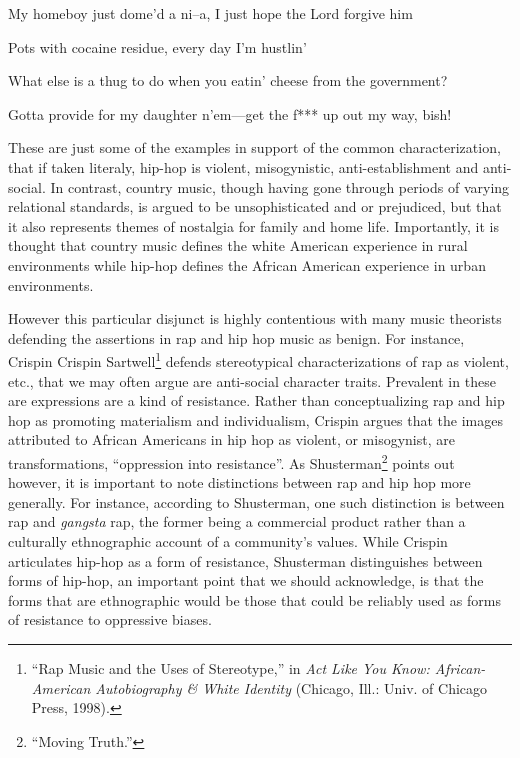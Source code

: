 \documentclass[phdthesis,12pt,final]{wuthesis}
\theoremstyle{definition}
\theoremstyle{definition}
\theoremstyle{definition}
\theoremstyle{definition}
\theoremstyle{remark}
\begin{document}
My homeboy just dome'd a ni--a, I just hope the Lord forgive him

Pots with cocaine residue, every day I'm hustlin'

What else is a thug to do when you eatin' cheese from the government?

Gotta provide for my daughter n'em---get the f*** up out my way, bish!

These are just some of the examples in support of the common characterization, that if taken literaly, hip-hop is violent, misogynistic, anti-establishment and anti-social. In contrast, country music, though having gone through periods of varying relational standards, is argued to be unsophisticated and or prejudiced, but that it also represents themes of nostalgia for family and home life. Importantly, it is thought that country music defines the white American experience in rural environments while hip-hop defines the African American experience in urban environments.

However this particular disjunct is highly contentious with many music theorists defending the assertions in rap and hip hop music as benign. For instance, Crispin Crispin Sartwell\footnote{{``Rap {Music} and the {Uses} of {Stereotype},''} in \emph{Act Like You Know: {African-American} Autobiography \& White Identity} (Chicago, Ill.: Univ. of Chicago Press, 1998).} defends stereotypical characterizations of rap as violent, etc., that we may often argue are anti-social character traits. Prevalent in these are expressions are a kind of resistance. Rather than conceptualizing rap and hip hop as promoting materialism and individualism, Crispin argues that the images attributed to African Americans in hip hop as violent, or misogynist, are transformations, ``oppression into resistance''. As Shusterman\footnote{{``Moving {Truth}.''}} points out however, it is important to note distinctions between rap and hip hop more generally. For instance, according to Shusterman, one such distinction is between rap and \emph{gangsta} rap, the former being a commercial product rather than a culturally ethnographic account of a community's values. While Crispin articulates hip-hop as a form of resistance, Shusterman distinguishes between forms of hip-hop, an important point that we should acknowledge, is that the forms that are ethnographic would be those that could be reliably used as forms of resistance to oppressive biases.
\end{document}
